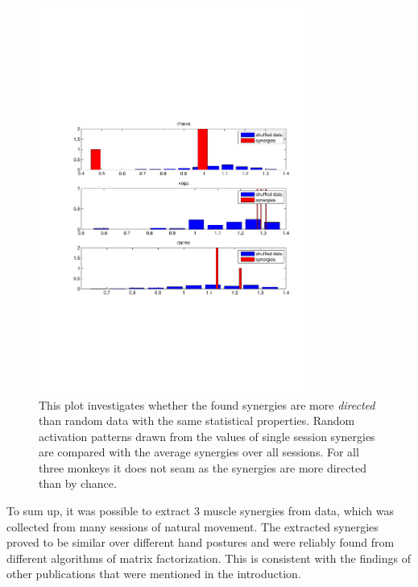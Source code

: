 \begin{figure}[ht]
    \centering
        \includegraphics[width=0.8\textwidth]{images/circ_std_syns.pdf}
    \caption{This plot investigates whether the found synergies are more \emph{directed} than random data with the same statistical properties. Random activation patterns drawn from the values of single session synergies are compared with the average synergies over all sessions. For all three monkeys it does not seam as the synergies are more directed than by chance.}
    \label{sg:fig:images_circ_std_syns}
\end{figure}

To sum up, it was possible to extract 3 muscle synergies from data, which was collected from many sessions of natural movement. The extracted synergies proved to be similar over different hand postures and were reliably found from different algorithms of matrix factorization. This is consistent with the findings of other publications that were mentioned in the introduction.



\afterpage{\clearpage}



